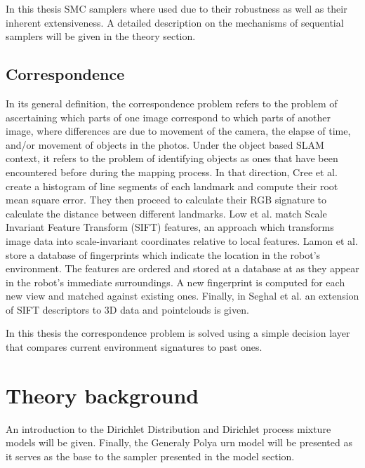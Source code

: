 \documentclass[twoside,hidelinks]{article}
\begin{document}
In this thesis SMC samplers where used due to their robustness as well as their inherent extensiveness. A detailed description on the mechanisms of sequential samplers will be given in the theory section.

\subsection{Correspondence}

In its general definition, the correspondence problem refers to the problem of ascertaining which parts of one image correspond to which parts of another image, where differences are due to movement of the camera, the elapse of time, and/or movement of objects in the photos. Under the object based SLAM context, it refers to the problem of identifying objects as ones that have been encountered before during the mapping process. In that direction, Cree et al.\cite{corresp:first} create a histogram of line segments of each landmark and compute their root mean square error. They then proceed to calculate their RGB signature to calculate the distance between different landmarks. Low et al.\cite{corres:sec} match Scale Invariant Feature Transform (SIFT) features, an approach which transforms image data into scale-invariant coordinates relative to local features. Lamon et al.\cite{corres:three} store a database of fingerprints which indicate the location in the robot's environment. The features are ordered and stored at a database at as they appear in the robot's immediate surroundings. A new fingerprint is computed for each new view and matched against existing ones. Finally, in Seghal et al.\cite{corres:four} an extension of SIFT descriptors to 3D data and pointclouds is given. 

In this thesis the correspondence problem is solved using a simple decision layer that compares current environment signatures to past ones.


\newpage
\section{Theory background}
\label{sec:theory}


An introduction to the Dirichlet Distribution and Dirichlet process mixture models will be given. Finally, the Generaly Polya urn model will be presented as it serves as the base to the sampler presented in the model section.
\end{document}
